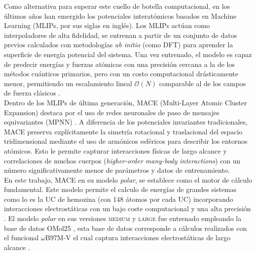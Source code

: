 \documentclass[12pt,letterpaper,oneside]{report}
\begin{document}
Como alternativa para superar este cuello de botella computacional, en los últimos años han emergido los potenciales interatómicos basados en Machine Learning (MLIPs, por sus siglas en inglés). Los MLIPs actúan como interpoladores de alta fidelidad, se entrenan a partir de un conjunto de datos previos calculados con metodologías \textit{ab initio} (como DFT) para aprender la superficie de energía potencial del sistema. Una vez entrenado, el modelo es capaz de predecir energías y fuerzas atómicas con una precisión cercana a la de los métodos cuánticos primarios, pero con un costo computacional drásticamente menor, permitiendo un escalamiento lineal $\mathcal{O}(N)$ comparable al de los campos de fuerza clásicos \cite{batatia2023mace}.\\

Dentro de los MLIPs de última generación, MACE (Multi-Layer Atomic Cluster Expansion) destaca por el uso de redes neuronales de paso de mensajes equivariantes (MPNN) \cite{batatia2023mace, batatia2026macepolar}. A diferencia de los potenciales invariantes tradicionales, MACE preserva explícitamente la simetría rotacional y traslacional del espacio tridimensional mediante el uso de armónicos esféricos para describir los entornos atómicos. Esto le permite capturar interacciones físicas de largo alcance y correlaciones de muchos cuerpos (\textit{higher-order many-body interactions}) con un número significativamente menor de parámetros y datos de entrenamiento.\\

En este trabajo, MACE en su modelo \textit{polar}, se establece como el motor de cálculo fundamental. Este modelo permite el calculo de energías de grandes sistemas como lo es la UC de hemozina (con 148 átomos por cada UC) incorporando interacciones electrostáticas con un bajo coste computacional y una alta precisión \cite{batatia2026macepolar}. El modelo \textit{polar} en sus versiones \textsc{medium} y \textsc{large} fue entrenado empleando la base de datos OMol25 \cite{ batatia2026macepolar,omol2025}, esta base de datos corresponde a cálculos realizados con el funcional $\omega\text{B97M-V}$ el cual captura interacciones electrostáticas de largo alcance \cite{mardirossian2016wb97m}.\\
\end{document}
